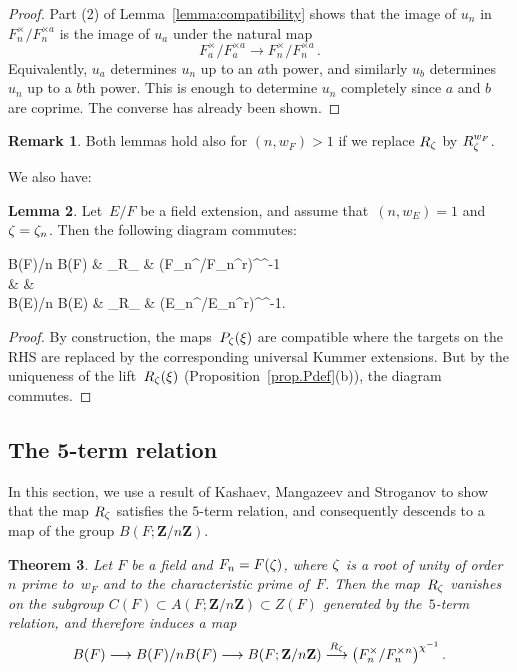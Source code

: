 \documentclass[12pt,reqno]{amsart}
\newtheorem{theorem}{Theorem}[section]
\theoremstyle{definition}
\newtheorem{lemma}[theorem]{Lemma}
\newtheorem{remark}[theorem]{Remark}
\newcommand{\changed}[1]{{#1}}
\def\Z{\mathbf Z}   %
\def\nn{n}
\begin{document}
\begin{proof}
Part (2) of Lemma~\ref{lemma:compatibility} shows that the image of $u_\nn$ in
$F_\nn^\times/F_\nn^{\times a}$ is the image of $u_a$ under the natural map
$$
F_a^\times/F_a^{\times a} \to F_\nn^\times/F_\nn^{\times a} \,.
$$
Equivalently, $u_a$ determines $u_\nn$ up to an $a$th power, and similarly 
$u_b$ determines $u_\nn$ up to a $b$th power. This is enough to determine 
$u_\nn$ completely since $a$ and $b$ are coprime. The converse has already been shown.
\end{proof}

\begin{remark}
Both lemmas hold also for $(\nn,w_F)>1$
if we replace $R_\zeta$ by $R^{w_F}_{\zeta}$.
\end{remark}

\changed{
We also have:
\begin{lemma}
\label{lemma:compatibility2} 
Let~$E/F$ be a field extension, and assume that~$(n,w_E) = 1$ and~$\z = \z_{\nn}$.
Then the following diagram commutes:
\begin{diagram}
B(F)/n B(F) & \rTo_{R_{\z}} & \left(F_\nn^{\times}/F_\nn^{\times r}\right)^{\chi^{-1}} \\
\dTo & & \dTo \\
B(E)/n B(E) &  \rTo_{R_{\z}} & \left(E_\nn^{\times}/E_\nn^{\times r}\right)^{\chi^{-1}}.
\end{diagram}
\end{lemma}

\begin{proof}  
By construction, the maps~$P_{\zeta}(\xi)$  are compatible where the targets
on the RHS are replaced by the corresponding universal Kummer extensions.  But by the uniqueness of the 
lift~$R_{\zeta}(\xi)$ (Proposition~\ref{prop.Pdef}(b)), the diagram commutes.
\end{proof}
}





\subsection{The 5-term relation}
\label{sub.5term}

In this section,  we use a result of Kashaev, Mangazeev and Stroganov 
to show that the map $R_\zeta$ satisfies the $5$-term relation, and 
consequently descends to a map of the group $B(F;\Z/\nn\Z)$.

\begin{theorem}
\label{thm.5term} 
Let $F$ be a field and $F_\nn=F(\z)$, where $\zeta$ is a root of unity 
of order~$\nn$ prime to~$w_F$ and to the characteristic prime of~$F$. Then 
the map~$R_\zeta$ vanishes on the subgroup 
$C(F) \subset A(F;\Z/\nn\Z) \subset Z(F)$ generated by the~$5$-term 
relation, and therefore induces a map
$$
B(F) \longrightarrow  B(F)/\nn B(F) \longrightarrow B(F;\Z/\nn\Z)
\stackrel{R_\z}{\longrightarrow} 
\bigl(F_\nn^{\times}/F_\nn^{\times \nn}\bigr)^{\chi^{-1}} \,.
$$
\end{theorem}
\end{document}
